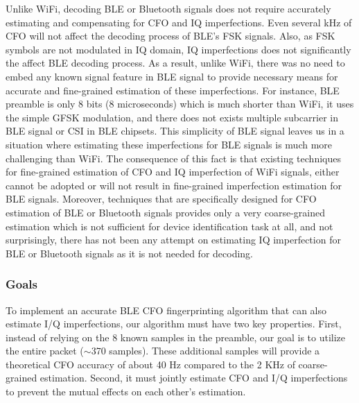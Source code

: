Unlike WiFi, decoding BLE or Bluetooth signals does not require accurately
estimating and compensating for CFO and IQ imperfections.
%
Even several kHz of CFO will not affect the decoding process of BLE's FSK
signals. Also, as FSK symbols are not modulated in IQ domain, IQ imperfections
does not significantly the affect BLE decoding process.
%
As a result, unlike WiFi, there was no need to embed any known signal feature
in BLE signal to provide necessary means for accurate and fine-grained
estimation of these imperfections.
%
For instance, BLE preamble is only 8 bits (8 microseconds) which is much
shorter than WiFi, it uses the simple GFSK modulation, and there does not
exists multiple subcarrier in BLE signal or CSI in BLE chipsets. This
simplicity of BLE signal leaves us in a situation where estimating these
imperfections for BLE signals is much more challenging than WiFi.
The consequence of this fact is that existing techniques for fine-grained
estimation of CFO and IQ imperfection of WiFi signals, either cannot be
adopted or will not result in fine-grained imperfection estimation for BLE
signals.  Moreover, techniques that are specifically designed for CFO
estimation of BLE or Bluetooth signals provides only a very coarse-grained
estimation which is not sufficient for device identification task at all, and
not surprisingly, there has not been any attempt on estimating IQ imperfection
for BLE or Bluetooth signals as it is not needed for decoding.
\fi


%

%
%

\subsubsection{Goals}
%
To implement an accurate BLE CFO fingerprinting algorithm that can also estimate I/Q imperfections, our algorithm must have two key properties.
%
First, instead of relying on the 8 known samples in the preamble, our goal is
to utilize the entire packet ($\sim$370 samples).
These additional samples will provide a theoretical CFO accuracy of 
about 40 Hz compared to the 2 KHz of coarse-grained
estimation.
%
Second, it must jointly estimate CFO and I/Q imperfections to prevent the
mutual effects on each other's estimation.


